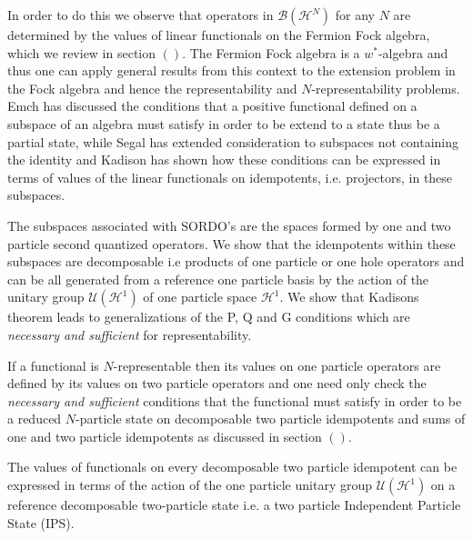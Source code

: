 \documentclass[aps,preprint]{revtex4}%
\begin{document}
In order to do this we observe that operators in $\mathcal{B}\left(
\mathcal{H}^{N}\right)  $ for any $N$ are determined by the values of linear
functionals on the Fermion Fock algebra, which we review in section $\left(
{}\right)  .$ The Fermion Fock algebra is a $w^{\ast}$-algebra and thus one
can apply general results from this context to the extension problem in the
Fock algebra and hence the representability and $N$-representability problems.
Emch has discussed the conditions that a positive functional defined on a
subspace of an algebra must satisfy in order to be extend to a state thus be a
partial state, while Segal has extended consideration to subspaces not
containing the identity and Kadison has shown how these conditions can be
expressed in terms of values of the linear functionals on idempotents, i.e.
projectors, in these subspaces.

The subspaces associated with SORDO's are the spaces formed by one and two
particle second quantized operators. We show that the idempotents within these
subspaces are decomposable i.e products of one particle or one hole operators
and can be all generated from a reference one particle basis by the action of
the unitary group $\mathcal{U}\left(  \mathcal{H}^{1}\right)  $ of one
particle space $\mathcal{H}^{1}.$ We show that Kadisons theorem leads to
generalizations of the P, Q and G conditions which are \emph{necessary and
sufficient }for\emph{ }representability.

If a functional is $N$-representable then its values on one particle operators
are defined by its values on two particle operators and one need only check
the \emph{necessary and sufficient} conditions that the functional must
satisfy in order to be a reduced $N$-particle state on decomposable two
particle idempotents and sums of one and two particle idempotents as discussed
in section $\left(  {}\right)  $.

The values of functionals on every decomposable two particle idempotent can be
expressed in terms of the action of the one particle unitary group
$\mathcal{U}\left(  \mathcal{H}^{1}\right)  $ on a reference decomposable
two-particle state i.e. a two particle Independent Particle State (IPS).
\end{document}
